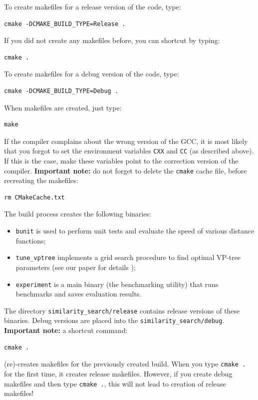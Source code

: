 \documentclass[runningheads,a4paper]{llncs}
\newcommand{\ttt}[1]{\texttt{#1}}
\begin{document}
{To create makefiles for a release version of the code, type:
\begin{verbatim}
cmake -DCMAKE_BUILD_TYPE=Release .
\end{verbatim}
If you did not create any makefiles before, you can shortcut by typing:
\begin{verbatim}
cmake . 
\end{verbatim}
To create makefiles for a debug version of the code, type:
\begin{verbatim}
cmake -DCMAKE_BUILD_TYPE=Debug .
\end{verbatim}
When makefiles are created, just type:
\begin{verbatim}
make
\end{verbatim}
If the compiler complains about the wrong version of the GCC, 
it is most likely that you forgot to set the environment variables \ttt{CXX} and \ttt{CC} (as described above).
If this is the case, make these variables point to the correction version of the compiler.
\textbf{Important note:} do not forget to delete the \ttt{cmake} cache file, before recreating the makefiles:
\begin{verbatim}
rm CMakeCache.txt
\end{verbatim}

The build process creates the following binaries:
\begin{itemize}
\item \ttt{bunit} is used to perform unit tests and 
evaluate the speed of various distance functions;
\item \ttt{tune\_vptree} implements a grid search procedure to find optimal VP-tree parameters (see our paper for details \cite{Boytsov_and_Bilegsaikhan:nips2013});
\item \ttt{experiment} is a main binary (the benchmarking utility) that runs benchmarks and saves evaluation results.
\end{itemize}

The directory \ttt{similarity\_search/release} contains release versions of
these binaries. Debug versions are placed into the \ttt{similarity\_search/debug}.
\textbf{Important note:} a shortcut command:
\begin{verbatim}
cmake .
\end{verbatim} 
(re)-creates makefiles for the previously 
created build. When you type \ttt{cmake .} for the first time,
it creates release makefiles. However, if you create debug
makefiles and then type \ttt{cmake .}, 
this will not lead to creation of release makefiles! 

}
\end{document}
